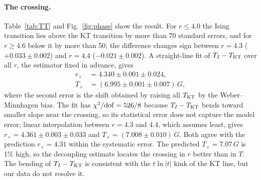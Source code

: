 \documentclass[pre,reprint,superscriptaddress,longbibliography,amsmath,amssymb,floatfix]{revtex4-2}
\begin{document}
\paragraph*{The crossing.} Table~\ref{tab:TT} and Fig.~\ref{fig:phase} show the result. For $r\le4.0$ the Ising transition lies above the KT transition by more than 70 standard errors, and for $r\ge4.6$ below it by more than 50; the difference changes sign between $r=4.3$ ($+0.033\pm0.002$) and $r=4.4$ ($-0.021\pm0.002$). A straight-line fit of $T_I-T_{\rm KT}$ over all $r$, the estimator fixed in advance, gives
\begin{align}
r_\times&=4.340\pm0.001\pm0.024,\nonumber\\
T_\times&=(6.995\pm0.001\pm0.007)\,G,
\label{eq:rxmc}
\end{align}
where the second error is the shift obtained by raising all $T_{\rm KT}$ by the Weber--Minnhagen bias. The fit has $\chi^2/{\rm dof}=526/8$ because $T_I-T_{\rm KT}$ bends toward smaller slope near the crossing, so its statistical error does not capture the model error; linear interpolation between $r=4.3$ and 4.4, which assumes least, gives $r_\times=4.361\pm0.003\pm0.033$ and $T_\times=(7.008\pm0.010)\,G$. Both agree with the prediction $r_\times=4.31$ within the systematic error. The predicted $T_\times=7.07\,G$ is 1\% high, so the decoupling estimate locates the crossing in $r$ better than in $T$. The bending of $T_I-T_{\rm KT}$ is consistent with the $t\ln|t|$ kink of the KT line, but our data do not resolve it.
\end{document}
